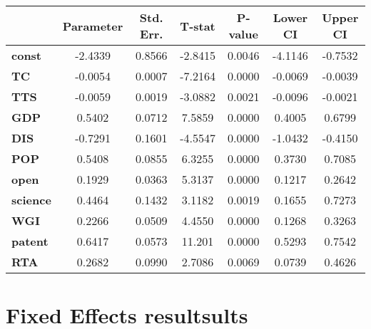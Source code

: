 \documentclass{article}
\begin{document}
\begin{center}
\begin{tabular}{lclc}
\end{tabular}
\begin{tabular}{lcccccc}
                 & \textbf{Parameter} & \textbf{Std. Err.} & \textbf{T-stat} & \textbf{P-value} & \textbf{Lower CI} & \textbf{Upper CI}  \\
\midrule
\textbf{const}   &      -2.4339       &       0.8566       &     -2.8415     &      0.0046      &      -4.1146      &      -0.7532       \\
\textbf{TC}      &      -0.0054       &       0.0007       &     -7.2164     &      0.0000      &      -0.0069      &      -0.0039       \\
\textbf{TTS}     &      -0.0059       &       0.0019       &     -3.0882     &      0.0021      &      -0.0096      &      -0.0021       \\
\textbf{GDP}     &       0.5402       &       0.0712       &      7.5859     &      0.0000      &       0.4005      &       0.6799       \\
\textbf{DIS}     &      -0.7291       &       0.1601       &     -4.5547     &      0.0000      &      -1.0432      &      -0.4150       \\
\textbf{POP}     &       0.5408       &       0.0855       &      6.3255     &      0.0000      &       0.3730      &       0.7085       \\
\textbf{open}    &       0.1929       &       0.0363       &      5.3137     &      0.0000      &       0.1217      &       0.2642       \\
\textbf{science} &       0.4464       &       0.1432       &      3.1182     &      0.0019      &       0.1655      &       0.7273       \\
\textbf{WGI}     &       0.2266       &       0.0509       &      4.4550     &      0.0000      &       0.1268      &       0.3263       \\
\textbf{patent}  &       0.6417       &       0.0573       &      11.201     &      0.0000      &       0.5293      &       0.7542       \\
\textbf{RTA}     &       0.2682       &       0.0990       &      2.7086     &      0.0069      &       0.0739      &       0.4626       \\
\bottomrule
\end{tabular}
\end{center}\section*{Fixed Effects resultsults}
\end{document}
